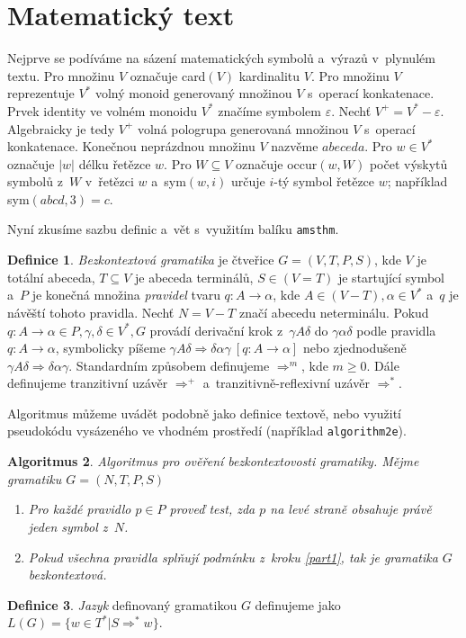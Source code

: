 \documentclass[11pt,twocolumn]{article}
\theoremstyle{definition}
\newtheorem{define}{Definice}[section]
\newtheorem{algorithm}[define]{Algoritmus}
\theoremstyle{plain}
\begin{document}
\section{Matematický text}
Nejprve se podíváme na sázení matematických symbolů a~výrazů v~plynulém textu. Pro množinu $V$ označuje card$(V)$ kardinalitu $V$. Pro množinu $V$ reprezentuje $V^*$ volný monoid generovaný množinou $V$ s~operací konkatenace. Prvek identity ve volném monoidu $V^*$ značíme symbolem $\varepsilon$. Nechť $V^+ =V^* - {\varepsilon}$. Algebraicky je tedy $V^+$ volná pologrupa generovaná množinou $V$ s~operací konkatenace. Konečnou neprázdnou množinu $V$ nazvěme  $abeceda$. Pro $w \in V^*$ označuje $|w|$ délku řetězce $w$. Pro $W \subseteq V$ označuje occur$(w, W)$ počet výskytů symbolů z~$W$ v~řetězci $w$ a~sym$(w, i)$ určuje $i$-tý symbol řetězce $w$; například sym$(abcd, 3) =c$.
\par
Nyní zkusíme sazbu definic a~vět s~využitím balíku \texttt{amsthm}.
\begin{define}\label{num1}
\emph {Bezkontextová gramatika} je čtveřice $G =(V,T,P,S)$, kde $V$ je totální abeceda, $T \subseteq V$ je abeceda terminálů, $S \in (V=T)$ je startující symbol a~$P$ je konečná množina \emph{pravidel} tvaru $q\colon A \rightarrow \alpha$, kde $A \in (V - T), \alpha \in V^*$ a~$q$ je návěští tohoto pravidla. Nechť $N = V - T$ značí abecedu neterminálu. Pokud $q\colon A \rightarrow \alpha \in P, \gamma, \delta \in V^*, G$ provádí derivační krok z~$\gamma A \delta$ do $\gamma\alpha\delta$ podle pravidla $q\colon A \rightarrow \alpha$, symbolicky píšeme $\gamma A \delta \Rightarrow \delta\alpha\gamma\ [q\colon A \rightarrow \alpha]$ nebo zjednodušeně $\gamma A \delta \Rightarrow \delta\alpha\gamma$. Standardním způsobem definujeme $\Rightarrow^m$, kde $m \geq 0$. Dále definujeme tranzitivní uzávěr $\Rightarrow^+$ a~tranzitivně-reflexivní uzávěr $\Rightarrow^*$.
\end{define}
\par
Algoritmus můžeme uvádět podobně jako definice textově, nebo využití pseudokódu vysázeného ve vhodném prostředí (například \texttt{algorithm2e}).
\begin{algorithm}
\emph{Algoritmus pro ověření bezkontextovosti gramatiky. Mějme gramatiku $G =(N,T,P,S)$}
\end{algorithm}
\begin{enumerate}
    \item \label{part1}
    \emph{Pro každé pravidlo $p \in P$ proveď test, zda $p$ na levé straně obsahuje právě jeden symbol z~$N$.}
    \item 
    \emph{Pokud všechna pravidla splňují podmínku z~kroku \ref{part1}, tak je gramatika $G$ bezkontextová.}
\end{enumerate}
\begin{define}
\emph{Jazyk} definovaný gramatikou $G$ definujeme jako $L(G) =\{w \in T^*|S \Rightarrow^* w\}$.
\end{define}
\end{document}
